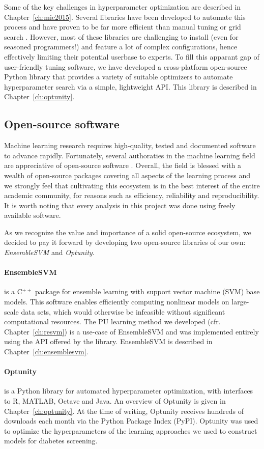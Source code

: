 Some of the key challenges in hyperparameter optimization are described in Chapter~\ref{ch:mic2015}. Several libraries have been developed to automate this process and have proven to be far more efficient than manual tuning or grid search \citep{hutter2009paramils, bergstra2012random, snoek2012practical, bergstra2013hyperopt}. However, most of these libraries are challenging to install (even for seasoned programmers!) and feature a lot of complex configurations, hence effectively limiting their potential userbase to experts. To fill this apparant gap of user-friendly tuning software, we have developed a cross-platform open-source Python library that provides a variety of suitable optimizers to automate hyperparameter search via a simple, lightweight API. This library is described in Chapter~\ref{ch:optunity}.


\subsection{Open-source software} \label{intro:software}
Machine learning research requires high-quality, tested and documented software to advance rapidly. Fortunately, several authoraties in the machine learning field are appreciative of open-source software \citep{sonnenburg2007need}. Overall, the field is blessed with a wealth of open-source packages covering all aspects of the learning process and we strongly feel that cultivating this ecosystem is in the best interest of the entire academic community, for reasons such as efficiency, reliability and reproducibility. It is worth noting that every analysis in this project was done using freely available software.

As we recognize the value and importance of a solid open-source ecosystem, we decided to pay it forward by developing two open-source libraries of our own: \emph{EnsembleSVM} and \emph{Optunity}.

\paragraph{EnsembleSVM} is a C$^{++}$ package for ensemble learning with support vector machine (SVM) base models. This software enables efficiently computing nonlinear models on large-scale data sets, which would otherwise be infeasible without significant computational resources. The PU learning method we developed (cfr. Chapter~\ref{ch:resvm}) is a use-case of EnsembleSVM and was implemented entirely using the API offered by the library. EnsembleSVM is described in Chapter~\ref{ch:ensemblesvm}.

\paragraph{Optunity} is a Python library for automated hyperparameter optimization, with interfaces to R, MATLAB, Octave and Java. An overview of Optunity is given in Chapter~\ref{ch:optunity}. At the time of writing, Optunity receives hundreds of downloads each month via the Python Package Index (PyPI). Optunity was used to optimize the hyperparameters of the learning approaches we used to construct models for diabetes screening.
